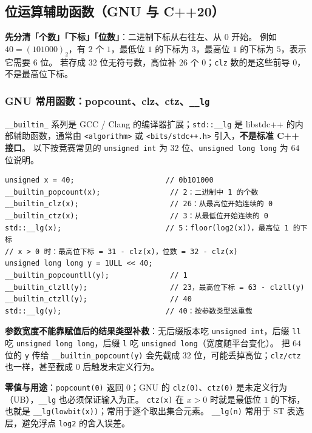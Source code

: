 \subsection{位运算辅助函数（GNU 与 C++20）}

\textbf{先分清「个数」「下标」「位数」}：二进制下标从右往左、从 $0$ 开始。
例如 $40=(101000)_2$，有 $2$ 个 $1$，最低位 $1$ 的下标为 $3$，最高位 $1$ 的下标为 $5$，表示它需要 $6$ 位。
若存成 $32$ 位无符号数，高位补 $26$ 个 $0$；\texttt{clz} 数的是这些前导 $0$，不是最高位下标。

\subsubsection{GNU 常用函数：popcount、clz、ctz、\texorpdfstring{\texttt{\_\_lg}}{\_\_lg}}

\texttt{\_\_builtin\_} 系列是 GCC / Clang 的编译器扩展；\texttt{std::\_\_lg} 是 libstdc++ 的内部辅助函数，通常由 \texttt{<algorithm>} 或 \texttt{<bits/stdc++.h>} 引入，\textbf{不是标准 C++ 接口}。
以下按竞赛常见的 \texttt{unsigned int} 为 $32$ 位、\texttt{unsigned long long} 为 $64$ 位说明。

\begin{verbatim}
unsigned x = 40;                     // 0b101000
__builtin_popcount(x);                // 2：二进制中 1 的个数
__builtin_clz(x);                     // 26：从最高位开始连续的 0
__builtin_ctz(x);                     // 3：从最低位开始连续的 0
std::__lg(x);                        // 5：floor(log2(x))，最高位 1 的下标
// x > 0 时：最高位下标 = 31 - clz(x)，位数 = 32 - clz(x)
unsigned long long y = 1ULL << 40;
__builtin_popcountll(y);              // 1
__builtin_clzll(y);                   // 23，最高位下标 = 63 - clzll(y)
__builtin_ctzll(y);                   // 40
std::__lg(y);                        // 40：按参数类型选重载
\end{verbatim}

\textbf{参数宽度不能靠赋值后的结果类型补救}：无后缀版本吃 \texttt{unsigned int}，后缀 \texttt{ll} 吃 \texttt{unsigned long long}，后缀 \texttt{l} 吃 \texttt{unsigned long}（宽度随平台变化）。
把 $64$ 位的 \texttt{y} 传给 \texttt{\_\_builtin\_popcount(y)} 会先截成 $32$ 位，可能丢掉高位；\texttt{clz/ctz} 也一样，甚至截成 $0$ 后触发未定义行为。

\textbf{零值与用途}：\texttt{popcount(0)} 返回 $0$；GNU 的 \texttt{clz(0)}、\texttt{ctz(0)} 是未定义行为（UB），\texttt{\_\_lg} 也必须保证输入为正。
\texttt{ctz(x)} 在 $x>0$ 时就是最低位 $1$ 的下标，也就是 \texttt{\_\_lg(lowbit(x))}；常用于逐个取出集合元素。
\texttt{\_\_lg(n)} 常用于 ST 表选层，避免浮点 \texttt{log2} 的舍入误差。

